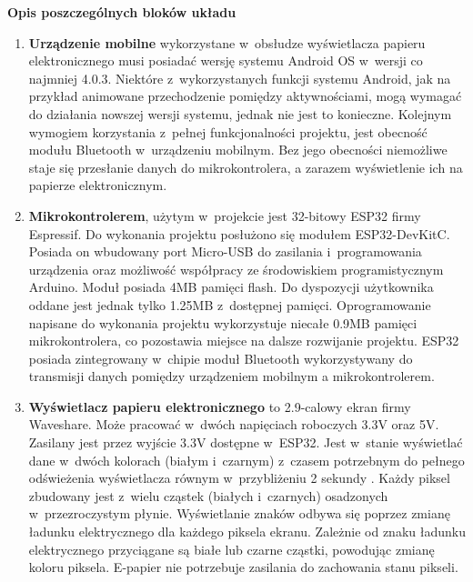 \documentclass[a4paper,12pt, twoside]{article}
\begin{document}
        \begin{flushleft}
        \textbf{Opis poszczególnych bloków układu}
        \end{flushleft}
        \begin{enumerate}
            \item \textbf{Urządzenie mobilne} wykorzystane w~obsłudze wyświetlacza papieru elektronicznego musi posiadać wersję systemu Android OS w~wersji co najmniej 4.0.3. Niektóre z~wykorzystanych funkcji systemu Android, jak na przykład animowane przechodzenie pomiędzy aktywnościami, mogą wymagać do działania nowszej wersji systemu, jednak nie jest to konieczne.
            Kolejnym wymogiem korzystania z~pełnej funkcjonalności projektu, jest obecność modułu Bluetooth w~urządzeniu mobilnym. Bez jego obecności niemożliwe staje się przesłanie danych do mikrokontrolera, a zarazem wyświetlenie ich na papierze elektronicznym.
        
    	    \item \textbf{Mikrokontrolerem}, użytym w~projekcie jest 32-bitowy ESP32 firmy Espressif. Do wykonania projektu posłużono się modułem ESP32-DevKitC. Posiada on wbudowany port Micro-USB do zasilania i~programowania urządzenia oraz możliwość współpracy ze środowiskiem programistycznym Arduino. Moduł posiada 4MB pamięci flash\cite{flash}. Do dyspozycji użytkownika oddane jest jednak tylko 1.25MB z~dostępnej pamięci. Oprogramowanie napisane do wykonania projektu wykorzystuje niecałe 0.9MB pamięci mikrokontrolera, co pozostawia miejsce na dalsze rozwijanie projektu. ESP32 posiada zintegrowany w~chipie moduł Bluetooth wykorzystywany do transmisji danych pomiędzy urządzeniem mobilnym a mikrokontrolerem.
    
    
            \item \textbf{Wyświetlacz papieru elektronicznego} to 2.9-calowy ekran firmy Waveshare. Może pracować w~dwóch napięciach roboczych 3.3V oraz 5V. Zasilany jest przez wyjście 3.3V dostępne w~ESP32. Jest w~stanie wyświetlać dane w~dwóch kolorach (białym i~czarnym) z~czasem potrzebnym do pełnego odświeżenia wyświetlacza równym w~przybliżeniu 2 sekundy \cite{waveshare}. Każdy piksel zbudowany jest z~wielu cząstek (białych i~czarnych) osadzonych w~przezroczystym płynie. Wyświetlanie znaków odbywa się poprzez zmianę ładunku elektrycznego dla każdego piksela ekranu. Zależnie od znaku ładunku elektrycznego przyciągane są białe lub czarne cząstki, powodując zmianę koloru piksela. E-papier nie potrzebuje zasilania do zachowania stanu pikseli.\newpage
            

\end{enumerate}
\end{document}
